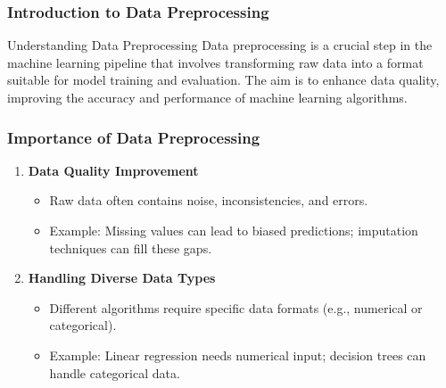 \documentclass[aspectratio=169]{beamer}
\begin{document}
\frame{\titlepage}

\begin{frame}[fragile]
    \frametitle{Introduction to Data Preprocessing}
    \begin{block}{Understanding Data Preprocessing}
        Data preprocessing is a crucial step in the machine learning pipeline that involves transforming raw data into a format suitable for model training and evaluation. The aim is to enhance data quality, improving the accuracy and performance of machine learning algorithms.
    \end{block}
\end{frame}

\begin{frame}[fragile]
    \frametitle{Importance of Data Preprocessing}
    \begin{enumerate}
        \item \textbf{Data Quality Improvement}
        \begin{itemize}
            \item Raw data often contains noise, inconsistencies, and errors.
            \item Example: Missing values can lead to biased predictions; imputation techniques can fill these gaps.
        \end{itemize}

        \item \textbf{Handling Diverse Data Types}
        \begin{itemize}
            \item Different algorithms require specific data formats (e.g., numerical or categorical).
            \item Example: Linear regression needs numerical input; decision trees can handle categorical data.
        \end{itemize}
    \end{enumerate}
\end{frame}
\end{document}
